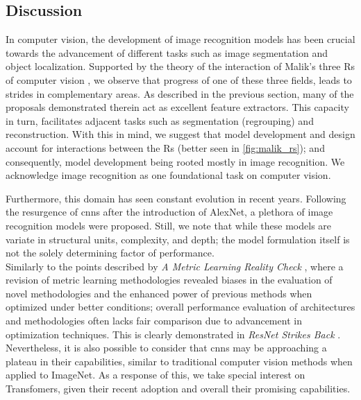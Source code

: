 \subsection{Discussion}
\label{subsec:rel_recon_discussion}
In computer vision, the development of image recognition models has been crucial 
towards the advancement of different tasks such as image segmentation and object localization. 
Supported by the theory of the interaction of Malik's three Rs of computer vision 
\autocite{malik2016three}, we observe that progress of one of these three fields, leads to strides 
in complementary areas. As described in the previous section, many of the proposals demonstrated 
therein act as excellent feature extractors. This capacity in turn, facilitates adjacent tasks 
such as segmentation (regrouping) and reconstruction. With this in mind, we suggest that model 
development and design account for interactions between the Rs (better seen in  
\autoref{fig:malik_rs}); and consequently, model development being rooted mostly in image 
recognition. We acknowledge image recognition as one foundational task on computer vision.



\noindent Furthermore, this domain has seen constant evolution in recent years. Following the 
resurgence of \glspl{cnn} after the introduction of AlexNet, a plethora of image recognition models 
were proposed. Still, we note that while these models are variate in structural units, complexity, 
and depth; the model formulation  itself is not the solely determining factor of performance.\\

\noindent Similarly to the points described by \emph{A Metric Learning Reality 
Check} \autocite{musgrave2020metric}, where a revision of metric learning methodologies revealed 
biases in the evaluation of novel methodologies and the enhanced power of 
previous methods when optimized under better conditions; overall performance evaluation of 
architectures and methodologies often lacks fair comparison due to advancement in optimization 
techniques. This is clearly demonstrated in \emph{ResNet Strikes Back} \autocite{wightman2021resnet}. 
Nevertheless, it is also possible to consider that \glspl{cnn} may be approaching a plateau in 
their capabilities, similar to traditional computer vision methods  when applied to ImageNet. As 
a response of this, we take special interest on Transfomers, given their recent adoption and 
overall their promising capabilities. \\

